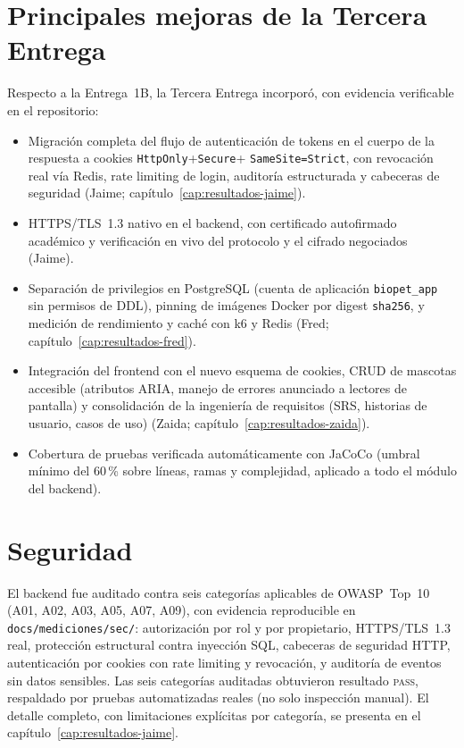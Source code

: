 \section*{Principales mejoras de la Tercera Entrega}
Respecto a la Entrega~1B, la Tercera Entrega incorpor\'o, con evidencia
verificable en el repositorio:
\begin{itemize}[nosep]
  \item Migraci\'on completa del flujo de autenticaci\'on de tokens en el
    cuerpo de la respuesta a cookies \texttt{HttpOnly}+\texttt{Secure}+
    \texttt{SameSite=Strict}, con revocaci\'on real v\'ia Redis, rate
    limiting de login, auditor\'ia estructurada y cabeceras de seguridad
    (Jaime; cap\'itulo~\ref{cap:resultados-jaime}).
  \item HTTPS/TLS~1.3 nativo en el backend, con certificado autofirmado
    acad\'emico y verificaci\'on en vivo del protocolo y el cifrado
    negociados (Jaime).
  \item Separaci\'on de privilegios en PostgreSQL (cuenta de aplicaci\'on
    \texttt{biopet_app} sin permisos de DDL), pinning de im\'agenes Docker
    por digest \texttt{sha256}, y medici\'on de rendimiento y cach\'e con
    k6 y Redis (Fred; cap\'itulo~\ref{cap:resultados-fred}).
  \item Integraci\'on del frontend con el nuevo esquema de cookies, CRUD de
    mascotas accesible (atributos ARIA, manejo de errores anunciado a
    lectores de pantalla) y consolidaci\'on de la ingenier\'ia de
    requisitos (SRS, historias de usuario, casos de uso) (Zaida;
    cap\'itulo~\ref{cap:resultados-zaida}).
  \item Cobertura de pruebas verificada autom\'aticamente con JaCoCo
    (umbral m\'inimo del 60\,\% sobre l\'ineas, ramas y complejidad,
    aplicado a todo el m\'odulo del backend).
\end{itemize}

\section*{Seguridad}
El backend fue auditado contra seis categor\'ias aplicables de OWASP~Top~10
(A01, A02, A03, A05, A07, A09), con evidencia reproducible en
\texttt{docs/mediciones/sec/}: autorizaci\'on por rol y por propietario,
HTTPS/TLS~1.3 real, protecci\'on estructural contra inyecci\'on SQL,
cabeceras de seguridad HTTP, autenticaci\'on por cookies con rate limiting y
revocaci\'on, y auditor\'ia de eventos sin datos sensibles. Las seis
categor\'ias auditadas obtuvieron resultado \textsc{pass}, respaldado por
pruebas automatizadas reales (no solo inspecci\'on manual). El detalle
completo, con limitaciones expl\'icitas por categor\'ia, se presenta en el
cap\'itulo~\ref{cap:resultados-jaime}.

